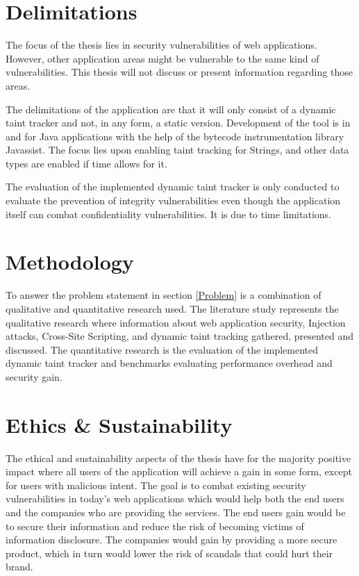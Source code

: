 \section{Delimitations}
\label{Delimitations}
The focus of the thesis lies in security vulnerabilities of web applications. However, other application areas might be vulnerable to the same kind of vulnerabilities. This thesis will not discuss or present information regarding those areas.

The delimitations of the application are that it will only consist of a dynamic taint tracker and not, in any form, a static version. Development of the tool is in and for Java applications with the help of the bytecode instrumentation library Javassist. The focus lies upon enabling taint tracking for Strings, and other data types are enabled if time allows for it.

The evaluation of the implemented dynamic taint tracker is only conducted to evaluate the prevention of integrity vulnerabilities even though the application itself can combat confidentiality vulnerabilities. It is due to time limitations.



\section{Methodology}
\label{Methodology}
To answer the problem statement in section \ref{Problem} is a combination of qualitative and quantitative research used. The literature study represents the qualitative research where information about web application security, Injection attacks, Cross-Site Scripting, and dynamic taint tracking gathered, presented and discussed. The quantitative research is the evaluation of the implemented dynamic taint tracker and benchmarks evaluating performance overhead and security gain.



\section{Ethics \& Sustainability}
\label{Ethics}
The ethical and sustainability aspects of the thesis have for the majority positive impact where all users of the application will achieve a gain in some form, except for users with malicious intent. The goal is to combat existing security vulnerabilities in today's web applications which would help both the end users and the companies who are providing the services. The end users gain would be to secure their information and reduce the risk of becoming victims of information disclosure. The companies would gain by providing a more secure product, which in turn would lower the risk of scandals that could hurt their brand. 

